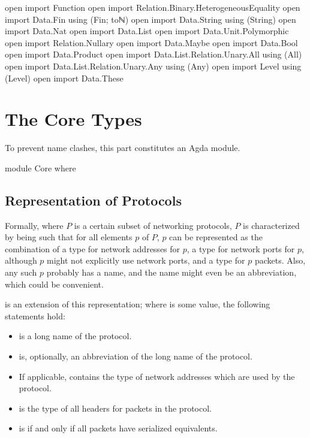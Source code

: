 \documentclass{report}
\begin{document}
\begin{code}
open import Function
open import Relation.Binary.HeterogeneousEquality
open import Data.Fin using (Fin; toℕ)
open import Data.String using (String)
open import Data.Nat
open import Data.List
open import Data.Unit.Polymorphic
open import Relation.Nullary
open import Data.Maybe
open import Data.Bool
open import Data.Product
open import Data.List.Relation.Unary.All using (All)
open import Data.List.Relation.Unary.Any using (Any)
open import Level using (Level)
open import Data.These
\end{code}

\part{The Core Types}
To prevent name clashes, this part constitutes an Agda module.

\begin{code}
module Core where
\end{code}

\chapter{Representation of Protocols}
Formally, where \(P\) is a certain subset of networking protocols, \(P\) is characterized by being such that for all elements \(p\) of \(P\), \(p\) can be represented as the combination of a type for network addresses for \(p\), a type for network ports for \(p\), although \(p\) might not explicitly use network ports, and a type for \(p\) packets.  Also, any such \(p\) probably has a name, and the name might even be an abbreviation, which could be convenient.

 is an extension of this representation; where  is some   value, the following statements hold:
\begin{itemize}
  \item {}  is a long name of the  protocol.
  \item {}  is, optionally, an abbreviation of the long name of the  protocol.
  \item If applicable,   contains the type of network addresses which are used by the  protocol.
  \item {}  is the type of all headers for packets in the  protocol.
  \item {}  is  if and only if all  packets have serialized equivalents.
\end{itemize}
\end{document}
